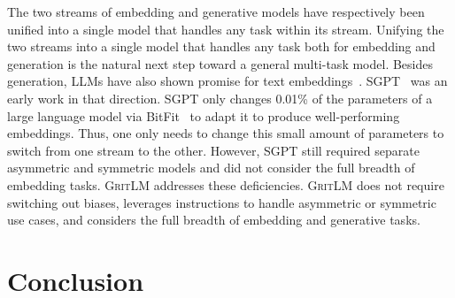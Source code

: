 \documentclass{article}
\newcommand{\model}{\textsc{GritLM}}
\begin{document}
The two streams of embedding and generative models have respectively been unified into a single model that handles any task within its stream. Unifying the two streams into a single model that handles any task both for embedding and generation is the natural next step toward a general multi-task model. Besides generation, LLMs have also shown promise for text embeddings~\cite{muennighoff2022sgpt,neelakantan2022text,jiang2023scaling,li2023deelm,li2023angleoptimized}. SGPT~\cite{muennighoff2022sgpt} was an early work in that direction. SGPT only changes 0.01\% of the parameters of a large language model via BitFit~\cite{zaken2022bitfit} to adapt it to produce well-performing embeddings. Thus, one only needs to change this small amount of parameters to switch from one stream to the other. However, SGPT still required separate asymmetric and symmetric models and did not consider the full breadth of embedding tasks. \model{} addresses these deficiencies. \model{} does not require switching out biases, leverages instructions to handle asymmetric or symmetric use cases, and considers the full breadth of embedding and generative tasks.

\section{Conclusion}
\end{document}
